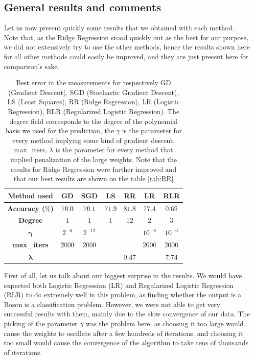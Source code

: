 \documentclass[10pt,conference,compsocconf]{IEEEtran}
\begin{document}
\subsection{General results and comments}
Let us now present quickly some results that we obtained with each method. Note that, as the Ridge Regression stood quickly out as the best for our purpose, we did not extensively try to use the other methods, hence the results shown here for all other methods could easily be improved, and they are just present here for comparison's sake.
\begin{table}[!h]
	\centering
	\begin{tabular}{c||c|c|c|c|c|c}
		\textbf{Method used} & GD & SGD & LS & RR & LR & RLR  \\
		\hline
		\textbf{Accuracy ($\%$)} & $70.0$&$70.1$&$71.9$&$81.8$&$77.4$&$0.69$\\
		\hline
		\textbf{Degree} & $1$ &$1$&$1$&$12$&$2$&$3$\\
		\hline
		$\mathbf{\gamma}$ & $2^{-6}$&$2^{-12}$&\diagbox{}&\diagbox{}&$10^{-8}$&$10^{-6}$\\
		\hline
		\textbf{max\_iters} & $2000$&$2000$&\diagbox{}&\diagbox{}&$2000$&$2000$\\
		\hline
		$\mathbf{\lambda}$ & \diagbox{}&\diagbox{}&\diagbox{}&$0.47$&\diagbox{}&$7.74$\\	
	\end{tabular}
	
	\caption{Best error in the measurements for respectively GD (Gradient Descent), SGD (Stochastic Gradient Descent), LS (Least Squares), RR (Ridge Regression), LR (Logistic Regression), RLR (Regularized Logistic Regression). The degree field corresponds to the degree of the polynomial basis we used for the prediction, the $\gamma$ is the parameter for every method implying some kind of gradient descent, max\_iters, $\lambda$ is the parameter for every method that implied penalization of the large weights. Note that the results for Ridge Regression were further improved and that our best results are shown on the table \ref{tab:RR}}
	\label{tab:results}
\end{table}

First of all, let us talk about our biggest surprise in the results. We would have expected both Logistic Regression (LR) and Regularized Logistic Regression (RLR) to do extremely well in this problem, as finding whether the output is a Boson is a classification problem. However, we were not able to get very successful results with them, mainly due to the slow convergence of our data. The picking of the parameter $\gamma$ was the problem here, as choosing it too large would cause the weights to oscillate after a few hundreds of iterations, and choosing it too small would cause the convergence of the algorithm to take tens of thousands of iterations. 
\end{document}
